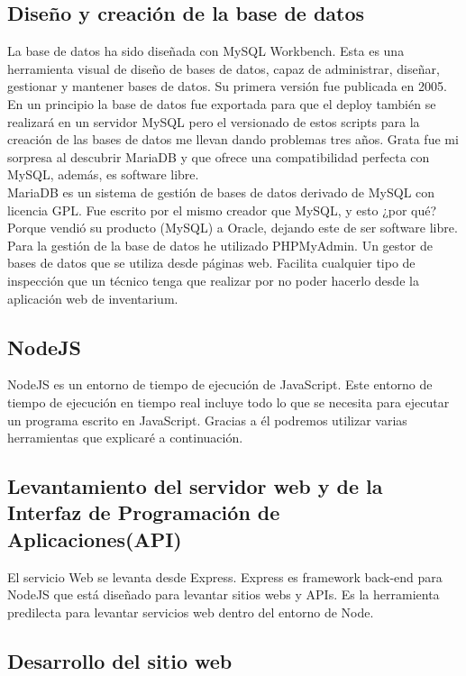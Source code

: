 \subsection{Diseño y creación de la base de datos}

La base de datos ha sido diseñada con MySQL Workbench. Esta es una herramienta visual de diseño de bases de datos, capaz de administrar, diseñar, gestionar y mantener bases de datos. Su primera versión fue publicada en 2005. 
\\En un principio la base de datos fue exportada para que el deploy también se realizará en un servidor MySQL pero el versionado de estos scripts para la creación de las bases de datos me llevan dando problemas tres años. Grata fue mi sorpresa al descubrir MariaDB y que ofrece una compatibilidad perfecta con MySQL, además, es software libre.
\\MariaDB es un sistema de gestión de bases de datos derivado de MySQL con licencia GPL. Fue escrito por el mismo creador que MySQL, y esto ¿por qué? Porque vendió su producto (MySQL) a Oracle, dejando este de ser software libre.
\\Para la gestión de la base de datos he utilizado PHPMyAdmin. Un gestor de bases de datos que se utiliza desde páginas web. Facilita cualquier tipo de inspección que un técnico tenga que realizar por no poder hacerlo desde la aplicación web de inventarium. 

\subsection{NodeJS}

NodeJS es un entorno de tiempo de ejecución de JavaScript. Este entorno de tiempo de ejecución en tiempo real incluye todo lo que se necesita para ejecutar un programa escrito en JavaScript. Gracias a él podremos utilizar varias herramientas que explicaré a continuación.

\subsection{Levantamiento del servidor web y de la Interfaz de Programación de Aplicaciones(API)}

El servicio Web se levanta desde Express. Express es framework back-end para NodeJS que está diseñado para levantar sitios webs y APIs. Es la herramienta predilecta para levantar servicios web dentro del entorno de Node.

\subsection{Desarrollo del sitio web}

